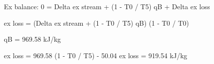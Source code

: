 Ex balance:  
0 = Delta ex stream + (1 - T0 / T5) qB + Delta ex loss  

ex loss = (Delta ex stream + (1 - T0 / T5) qB) (1 - T0 / T0)  

qB = 969.58 kJ/kg  

ex loss = 969.58 (1 - T0 / T5) - 50.04  
ex loss = 919.54 kJ/kg
